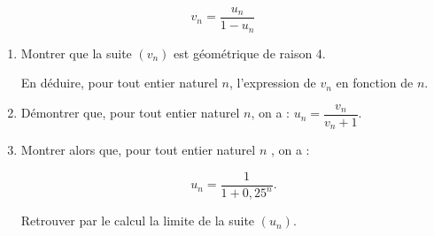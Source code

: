 \documentclass[10pt]{article}
\begin{document}
\begin{enumerate}
\[v_n  = \dfrac{u_n}{1 - u_n}\]

	\begin{enumerate}
		\item Montrer que la suite $\left(v_n\right)$ est géométrique de raison 4.
		
En déduire, pour tout entier naturel $n$, l'expression de $v_n$ en fonction de $n$.
		\item Démontrer que, pour tout entier naturel $n$, on a : $u_n = \dfrac{v_n}{v_n + 1}$. 
		\item Montrer alors que, pour tout entier naturel $n$ , on a :
		
		\[u_n = \dfrac{1}{1 + 0,25^n}.\]

Retrouver par le calcul la limite de la suite $\left(u_n\right)$.
	\end{enumerate}
\end{enumerate}

\bigskip
\end{document}
